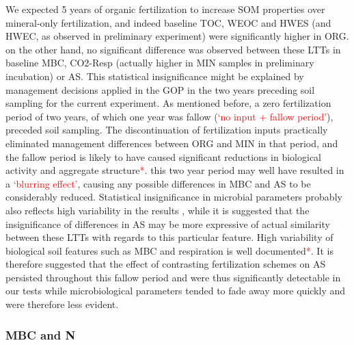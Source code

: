 \documentclass[12pt]{report}
\newcommand{\myRed}[1]{\textcolor{red}{#1}} %
\begin{document}
			We expected 5 years of organic fertilization to increase SOM properties over mineral-only fertilization, and indeed baseline TOC, WEOC and HWES (and HWEC, as observed in preliminary experiment) were significantly higher in ORG. on the other hand, no significant difference was observed between these LTTs in baseline MBC, CO2-Resp (actually higher in MIN samples in preliminary incubation) or AS. This statistical insignificance might be explained by management decisions applied in the GOP in the two years preceding soil sampling for the current experiment. As mentioned before, a zero fertilization period of two years, of which one year was fallow (\myRed{‘no input + fallow period’}), preceded soil sampling. The discontinuation of fertilization inputs practically eliminated management differences between ORG and MIN in that period, and the fallow period is likely to have caused significant reductions in biological activity and aggregate structure\myRed{*}. this two year period may well have resulted in a \myRed{‘blurring effect’}, causing any possible differences in MBC and AS to be considerably reduced. 
			Statistical insignificance in microbial parameters probably also reflects high variability in the results , while it is suggested that the insignificance of differences in AS may be more expressive of actual similarity between these LTTs with regards to this particular feature. High variability of biological soil features such as MBC and respiration is well documented\myRed{*}. It is therefore suggested that the effect of contrasting fertilization schemes on AS persisted throughout this fallow period and were thus significantly detectable in our tests while microbiological parameters tended to fade away more quickly and were therefore less evident. 
				
		\subsubsection{MBC and N}
			
\end{document}
